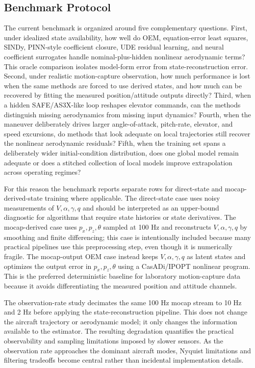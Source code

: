 \documentclass[11pt]{article}
\begin{document}
\subsection*{Benchmark Protocol}
The current benchmark is organized around five complementary questions. First, under idealized state availability, how well do OEM, equation-error least squares, SINDy, PINN-style coefficient closure, UDE residual learning, and neural coefficient surrogates handle nominal-plus-hidden nonlinear aerodynamic terms? This oracle comparison isolates model-form error from state-reconstruction error. Second, under realistic motion-capture observation, how much performance is lost when the same methods are forced to use derived states, and how much can be recovered by fitting the measured position/attitude outputs directly? Third, when a hidden SAFE/AS3X-like loop reshapes elevator commands, can the methods distinguish missing aerodynamics from missing input dynamics? Fourth, when the maneuver deliberately drives larger angle-of-attack, pitch-rate, elevator, and speed excursions, do methods that look adequate on local trajectories still recover the nonlinear aerodynamic residuals? Fifth, when the training set spans a deliberately wider initial-condition distribution, does one global model remain adequate or does a stitched collection of local models improve extrapolation across operating regimes?

For this reason the benchmark reports separate rows for direct-state and mocap-derived-state training where applicable. The direct-state case uses noisy measurements of $V,\alpha,\gamma,q$ and should be interpreted as an upper-bound diagnostic for algorithms that require state histories or state derivatives. The mocap-derived case uses $p_x,p_z,\theta$ sampled at 100 Hz and reconstructs $V,\alpha,\gamma,q$ by smoothing and finite differencing; this case is intentionally included because many practical pipelines use this preprocessing step, even though it is numerically fragile. The mocap-output OEM case instead keeps $V,\alpha,\gamma,q$ as latent states and optimizes the output error in $p_x,p_z,\theta$ using a CasADi/IPOPT nonlinear program. This is the preferred deterministic baseline for laboratory motion-capture data because it avoids differentiating the measured position and attitude channels.

The observation-rate study decimates the same 100 Hz mocap stream to 10 Hz and 2 Hz before applying the state-reconstruction pipeline. This does not change the aircraft trajectory or aerodynamic model; it only changes the information available to the estimator. The resulting degradation quantifies the practical observability and sampling limitations imposed by slower sensors. As the observation rate approaches the dominant aircraft modes, Nyquist limitations and filtering tradeoffs become central rather than incidental implementation details.
\end{document}

